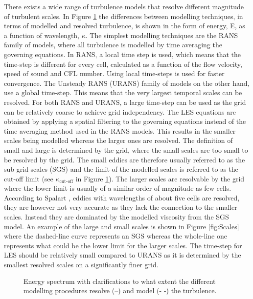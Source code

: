 There exists a wide range of turbulence models that resolve different magnitude of turbulent scales. In Figure \ref{fig:modelling} the differences between modelling techniques, in terms of modelled and resolved turbulence, is shown in the form of energy, E, as a function of wavelength, $\kappa$. The simplest modelling techniques are the RANS family of models, where all turbulence is modelled by time averaging the governing equations. In RANS, a local time step is used, which means that the time-step is different for every cell, calculated as a function of the flow velocity, speed of sound and CFL number. Using local time-steps is used for faster convergence. The Unsteady RANS (URANS) family of models on the other hand, use a global time-step. This means that the very largest temporal scales can be resolved. For both RANS and URANS, a large time-step can be used as the grid can be relatively coarse to achieve grid independency. The LES equations are obtained by applying a spatial filtering to the governing equations instead of the time averaging method used in the RANS models. This results in the smaller scales being modelled whereas the larger ones are resolved. The definition of small and large is determined by the grid, where the small scales are too small to be resolved by the grid. The small eddies are therefore usually referred to as the sub-grid-scales (SGS) and the limit of the modelled scales is referred to as the cut-off limit (see $\kappa _\text{cut-off}$ in Figure \ref{fig:modelling}). The larger scales are resolvable by the grid where the lower limit is usually of a similar order of magnitude as few cells. According to Spalart \cite{YoungsPersonGuide}, eddies with wavelengths of about five cells are resolved, they are however not very accurate as they lack the connection to the smaller scales. Instead they are dominated by the modelled viscosity from the SGS model. An example of the large and small scales is shown in Figure \ref{fig:Scales} where the dashed-line curve represents an SGS whereas the whole-line one represents what could be the lower limit for the larger scales. The time-step for LES should be relatively small compared to URANS as it is determined by the smallest resolved scales on a significantly finer grid. 
\begin{figure}[h]
   \centering

   \caption{Energy spectrum with clarifications to what extent the different modelling procedures resolve (--) and model ({\color{gray}- -}) the turbulence.}
  \label{fig:modelling}
\end{figure}

